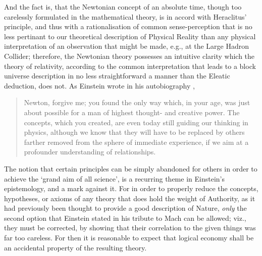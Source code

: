 And the fact is, that the Newtonian concept of an absolute time, though too carelessly formulated in the mathematical theory, is in accord with Heraclitus' principle, and thus with a rationalisation of common sense-perception that is no less pertinant to our theoretical description of Physical Reality than any physical interpretation of an observation that might be made, e.g., at the Large Hadron Collider; therefore, the Newtonian theory possesses an intuitive clarity which the theory of relativity, according to the common interpretation that leads to a block universe description in no less straightforward a manner than the Eleatic deduction, does not. As Einstein wrote in his autobiography \cite{Einstein1951},
\begin{quote}
Newton, forgive me; you found the only way which, in your age, was just about possible for a man of highest thought- and creative power. The concepts, which you created, are even today still guiding our thinking in physics, although we know that they will have to be replaced by others farther removed from the sphere of immediate experience, if we aim at a profounder understanding of relationships.
\end{quote}

The notion that certain principles can be simply abandoned for others in order to achieve the `grand aim of all science', is a recurring theme in Einstein's epistemology, and a mark against it. For in order to properly reduce the concepts, hypotheses, or axioms of any theory that does hold the weight of Authority, as it had previously been thought to provide a good description of Nature, \textit{only} the second option that Einstein stated in his tribute to Mach can be allowed; viz., they must be corrected, by showing that their correlation to the given things was far too careless. For then it is reasonable to expect that logical economy shall be an accidental property of the resulting theory.

